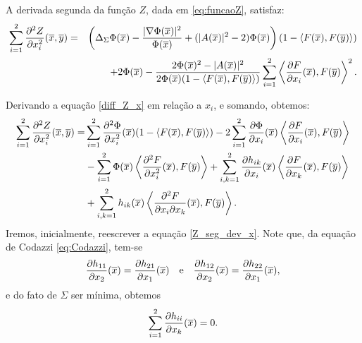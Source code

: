 \begin{proposicao}
	A derivada segunda da fun\c c\~ao $Z$, dada em \eqref{eq:funcaoZ},
	satisfaz:
	\begin{eqnarray*}\label{2_diff_Z_x}
		\sum_{i=1}^{2} \frac{\partial^2 Z}{\partial x_i^2} (\overline{x},\overline{y}) &=& 
		\left( \Delta_{\Sigma} \Phi(\overline{x}) - \frac{| \nabla \Phi(\overline{x}) |^2}{\Phi(\overline{x})} 
		+ (|A(\overline{x})|^2 - 2) \Phi(\overline{x}) \right) (1 - \left\langle F(\overline{x}), F(\overline{y}) \right\rangle) \\ 
		&&+ 2 \Phi(\overline{x}) - \frac{2 \Phi(\overline{x})^2 - |A(\overline{x})|^2}{2 \Phi(\overline{x})
			(1 - \langle F(\overline{x}), F(\overline{y}) \rangle)} \sum_{i=1}^2 \left\langle 
		\frac{\partial F}{\partial x_i}(\overline{x}), F(\overline{y}) \right\rangle^2.
	\end{eqnarray*}
\end{proposicao}
\begin{demonstracao}
	Derivando a equação \eqref{diff_Z_x} em rela\c c\~ao a $x_i$,
	e somando, obtemos:
	\begin{eqnarray}\label{Z_seg_dev_x}
	\begin{aligned}
	\sum_{i=1}^2\frac{\partial^2 Z}{\partial x_i^2}(\overline{x},\overline{y}) = &
	\sum_{i=1}^2\frac{\partial^2 \Phi}{\partial x_i^2}(\overline{x})
	(1 - \langle F(\overline{x}), F(\overline{y}) \rangle) -
	2\sum_{i=1}^2\frac{\partial \Phi}{\partial x_i}(\overline{x}) 
	\left\langle \frac{\partial F}{\partial x_i}(\overline{x}), F(\overline{y}) \right\rangle \\
	& - \sum_{i=1}^2\Phi(\overline{x}) \left\langle\frac{\partial^2 F}{\partial x_i^2}(\overline{x}),F(\overline{y})
	\right\rangle + \sum_{i,k=1}^2\frac{\partial h_{ik}}{\partial x_i}(\overline{x})
	\left\langle \frac{\partial F}{\partial x_k}(\overline{x}), F(\overline{y})\right\rangle \\ 
	&+ \sum_{i,k=1}^2h_{ik}(\overline{x})\left\langle
	\frac{\partial^2 F}{\partial x_i \partial x_k}(\overline{x}), F(\overline{y})\right\rangle.
	\end{aligned}
	\end{eqnarray}
	Iremos, inicialmente, reescrever a equa\c c\~ao \eqref{Z_seg_dev_x}.
	Note que, da equa\c c\~ao de Codazzi \eqref{eq:Codazzi}, tem-se
	\begin{eqnarray}\label{eq:Prop4.5-1}
	\frac{\partial h_{11}}{\partial x_2}(\overline{x}) = \frac{\partial h_{21}}{\partial x_1}(\overline{x})
	\quad\mbox{e}\quad
	\frac{\partial h_{12}}{\partial x_2}(\overline{x}) = \frac{\partial h_{22}}{\partial x_1}(\overline{x}),
	\end{eqnarray}
	e do fato de $\Sigma$ ser m\'inima, obtemos
	\begin{eqnarray}\label{eq:Prop4.5-2}
	\sum_{i=1}^2\frac{\partial h_{ii}}{\partial x_k}(\overline{x}) = 0.
	\end{eqnarray}

\end{demonstracao}
